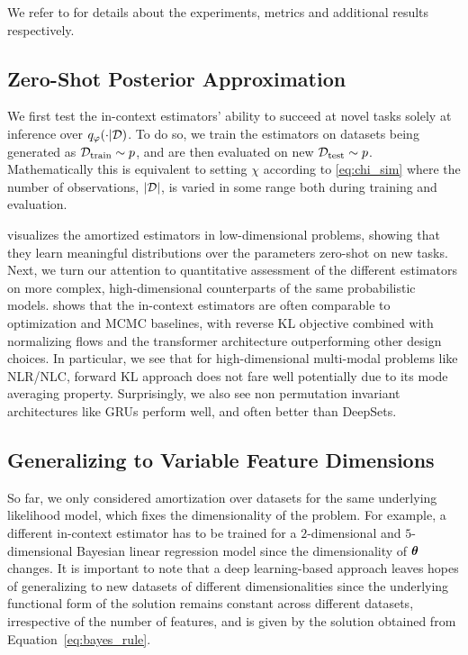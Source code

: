 We refer to  for details about the experiments, metrics and additional results respectively.

\vspace{-2mm}
\subsection{Zero-Shot Posterior Approximation}
\vspace{-1mm}
\label{subsec:fixed-dim}
We first test the in-context estimators' ability to succeed at novel tasks solely at inference over $q_\varphi(\cdot | {\mathcal{D}})$. To do so, we train the estimators on datasets being generated as ${\mathcal{D}}_{\text{train}} \sim p$, and are then evaluated on new ${\mathcal{D}}_{\text{test}} \sim p$. Mathematically this is equivalent to setting $\chi$ according to \cref{eq:chi_sim} where the number of observations, $|{\mathcal{D}}|$, is varied in some range both during training and evaluation. 


 visualizes the amortized estimators in low-dimensional problems, showing that they learn meaningful distributions over the parameters zero-shot on new tasks. Next, we turn our attention to quantitative assessment of the different estimators on more complex, high-dimensional counterparts of the same probabilistic models.  shows that the in-context estimators are often comparable to optimization and MCMC baselines, with reverse KL objective combined with normalizing flows and the transformer architecture outperforming other design choices. In particular, we see that for high-dimensional multi-modal problems like NLR/NLC, forward KL approach does not fare well potentially due to its mode averaging property. Surprisingly, we also see non permutation invariant architectures like GRUs perform well, and often better than DeepSets.

\vspace{-3mm}
\subsection{Generalizing to Variable Feature Dimensions}
\vspace{-1mm}
\label{subsec:variable-dim}
So far, we only considered amortization over datasets for the same underlying likelihood model, which fixes the dimensionality of the problem. For example, a different in-context estimator has to be trained for a $2$-dimensional and $5$-dimensional Bayesian linear regression model since the dimensionality of ${\bm{\theta}}$ changes. It is important to note that a deep learning-based approach leaves hopes of generalizing to new datasets of different dimensionalities since the underlying functional form of the solution remains constant across different datasets, irrespective of the number of features, and is given by the solution obtained from Equation~\ref{eq:bayes_rule}. 

